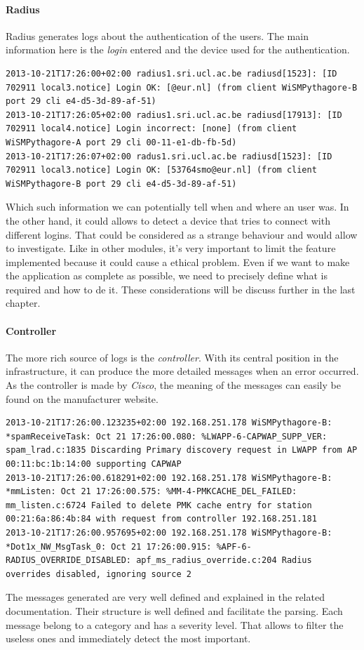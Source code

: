 \paragraph{Radius}
Radius generates logs about the authentication of the users. The main information here is the \emph{login} entered and the device used for the authentication.
\begin{lstlisting}[frame=single,breaklines=true,caption={Radius logs}]
2013-10-21T17:26:00+02:00 radius1.sri.ucl.ac.be radiusd[1523]: [ID 702911 local3.notice] Login OK: [@eur.nl] (from client WiSMPythagore-B port 29 cli e4-d5-3d-89-af-51)
2013-10-21T17:26:05+02:00 radius1.sri.ucl.ac.be radiusd[17913]: [ID 702911 local4.notice] Login incorrect: [none] (from client WiSMPythagore-A port 29 cli 00-11-e1-db-fb-5d)
2013-10-21T17:26:07+02:00 radus1.sri.ucl.ac.be radiusd[1523]: [ID 702911 local3.notice] Login OK: [53764smo@eur.nl] (from client WiSMPythagore-B port 29 cli e4-d5-3d-89-af-51)
\end{lstlisting}
Which such information we can potentially tell when and where an user was. In the other hand, it could allows to detect a device that tries to connect with different logins. That could be considered as a strange behaviour and would allow to investigate. Like in other modules, it's very important to limit the feature implemented because it could cause a ethical problem. Even if we want to make the application as complete as possible, we need to precisely define what is required and how to de it. These considerations will be discuss further in the last chapter.

\paragraph{Controller}
The more rich source of logs is the \emph{controller}. With its central position in the infrastructure, it can produce the more detailed messages when an error occurred. As the controller is made by \emph{Cisco}, the meaning of the messages can easily be found on the manufacturer website\cite{syslogCisco}.
\begin{lstlisting}[frame=single,breaklines=true,caption={Controller logs}]
2013-10-21T17:26:00.123235+02:00 192.168.251.178 WiSMPythagore-B: *spamReceiveTask: Oct 21 17:26:00.080: %LWAPP-6-CAPWAP_SUPP_VER: spam_lrad.c:1835 Discarding Primary discovery request in LWAPP from AP 00:11:bc:1b:14:00 supporting CAPWAP
2013-10-21T17:26:00.618291+02:00 192.168.251.178 WiSMPythagore-B: *mmListen: Oct 21 17:26:00.575: %MM-4-PMKCACHE_DEL_FAILED: mm_listen.c:6724 Failed to delete PMK cache entry for station 00:21:6a:86:4b:84 with request from controller 192.168.251.181
2013-10-21T17:26:00.957695+02:00 192.168.251.178 WiSMPythagore-B: *Dot1x_NW_MsgTask_0: Oct 21 17:26:00.915: %APF-6-RADIUS_OVERRIDE_DISABLED: apf_ms_radius_override.c:204 Radius overrides disabled, ignoring source 2 
\end{lstlisting}
The messages generated are very well defined and explained in the related documentation. Their structure is well defined and facilitate the parsing. Each message belong to a category and has a severity level. That allows to filter the useless ones and immediately detect the most important.

